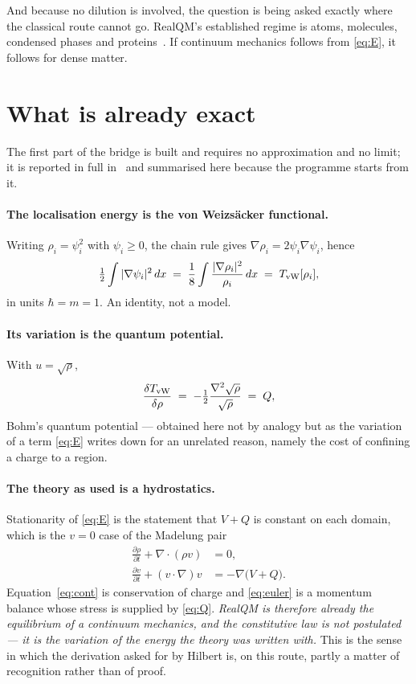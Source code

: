 \documentclass[11pt]{article}
\newcommand{\half}{\tfrac12}
\newcommand{\grad}{\nabla}
\begin{document}
And because no dilution is involved, the question is being asked exactly where the classical route
cannot go. RealQM's established regime is atoms, molecules, condensed phases and
proteins~\cite{realqmbook}. If continuum mechanics follows from \eqref{eq:E}, it follows for dense
matter.

\section{What is already exact}\label{sec:exact}

The first part of the bridge is built and requires no approximation and no limit; it is reported in
full in~\cite{madelung} and summarised here because the programme starts from it.

\paragraph{The localisation energy is the von Weizs\"acker functional.} Writing
$\rho_i=\psi_i^2$ with $\psi_i\ge0$, the chain rule gives $\grad\rho_i = 2\psi_i\grad\psi_i$, hence
\begin{equation}\label{eq:vW}
\half\int|\grad\psi_i|^2\,dx \;=\; \frac18\int\frac{|\grad\rho_i|^2}{\rho_i}\,dx
\;=\; T_{\rm vW}[\rho_i] ,
\end{equation}
in units $\hbar=m=1$. An identity, not a model.

\paragraph{Its variation is the quantum potential.} With $u=\sqrt{\rho}$,
\begin{equation}\label{eq:Q}
\frac{\delta T_{\rm vW}}{\delta\rho} \;=\; -\half\frac{\grad^2\sqrt{\rho}}{\sqrt{\rho}} \;=\; Q ,
\end{equation}
Bohm's quantum potential --- obtained here not by analogy but as the variation of a term
\eqref{eq:E} writes down for an unrelated reason, namely the cost of confining a charge to a region.

\paragraph{The theory as used is a hydrostatics.} Stationarity of \eqref{eq:E} is the statement that
$V+Q$ is constant on each domain, which is the $v=0$ case of the Madelung pair
\begin{align}
\frac{\partial\rho}{\partial t}+\grad\!\cdot(\rho v)&=0 ,\label{eq:cont}\\
\frac{\partial v}{\partial t}+(v\cdot\grad)v&=-\grad\bigl(V+Q\bigr) .\label{eq:euler}
\end{align}
Equation~\eqref{eq:cont} is conservation of charge and \eqref{eq:euler} is a momentum balance whose
stress is supplied by \eqref{eq:Q}. \emph{RealQM is therefore already the equilibrium of a continuum
mechanics, and the constitutive law is not postulated --- it is the variation of the energy the
theory was written with.} This is the sense in which the derivation asked for by Hilbert is, on this
route, partly a matter of recognition rather than of proof.
\end{document}
